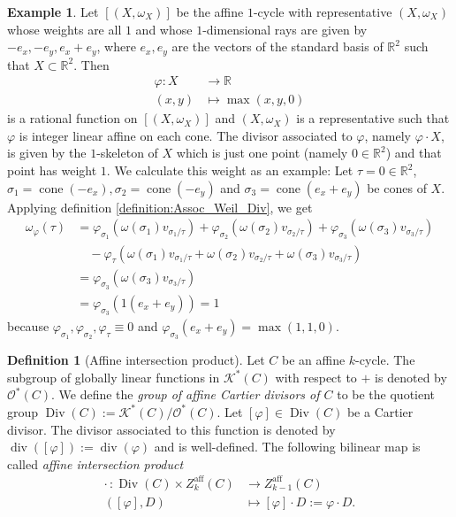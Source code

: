 \documentclass[11pt,reqno,a4]{amsart}
\theoremstyle{dotless}
\theoremstyle{definition}
\newtheorem{definition}[corollary]{Definition}
\newtheorem{example}[corollary]{Example}
\begin{document}
\begin{example}\label{example:pull_back_0_M_0,4}
Let $[(X,\omega_X)]$ be the affine $1$-cycle with representative $(X,\omega_X)$ whose weights are all $1$ and whose $1$-dimensional rays are given by $-e_x,-e_y,e_x+e_y$, where $e_x,e_y$ are the vectors of the standard basis of $\mathbb{R}^2$ such that $X\subset\mathbb{R}^2$. Then
\begin{align*}
\varphi: X &\to \mathbb{R}\\
(x,y)&\mapsto \max(x,y,0)
\end{align*}
is a rational function on $[(X,\omega_X)]$ and $(X,\omega_X)$ is a representative such that $\varphi$ is integer linear affine on each cone. The divisor associated to $\varphi$, namely $\varphi\cdot X$, is given by the $1$-skeleton of $X$ which is just one point (namely $0\in\mathbb{R}^2$) and that point has weight $1$. We calculate this weight as an example: Let $\tau=0\in\mathbb{R}^2$, $\sigma_1=\operatorname{cone}\left( -e_x  \right),\sigma_2=\operatorname{cone}\left(-e_y\right)$ and $\sigma_3=\operatorname{cone}\left(e_x+e_y\right)$ be cones of $X$. Applying definition \ref{definition:Assoc_Weil_Div}, we get
\begin{align*}
\omega_\varphi(\tau)&=\varphi_{\sigma_1}\left(\omega(\sigma_1)v_{\sigma_1/\tau}\right)
+\varphi_{\sigma_2}\left(\omega(\sigma_2)v_{\sigma_2/\tau}\right)
+\varphi_{\sigma_3}\left(\omega(\sigma_3)v_{\sigma_3/\tau}\right)\\
&\quad -\varphi_\tau\left( \omega(\sigma_1)v_{\sigma_1/\tau} + \omega(\sigma_2)v_{\sigma_2/\tau} + \omega(\sigma_3)v_{\sigma_3/\tau} \right)\\
&=\varphi_{\sigma_3}\left(\omega(\sigma_3)v_{\sigma_3/\tau}\right)\\
&=\varphi_{\sigma_3}\left( 1 (e_x+e_y) \right) = 1
\end{align*}
because $\varphi_{\sigma_1},\varphi_{\sigma_2},\varphi_{\tau}\equiv 0$ and $\varphi_{\sigma_3}\left(e_x+e_y \right)=\max(1,1,0)$.
\end{example}


\begin{definition}[Affine intersection product]
Let $C$ be an affine $k$-cycle. The subgroup of globally linear functions in $\mathcal{K}^*(C)$ with respect to $+$ is denoted by $\mathcal{O}^*(C)$. We define the \textit{group of affine Cartier divisors of $C$} to be the quotient group $\operatorname{Div}(C):=\mathcal{K}^*(C)/\mathcal{O}^*(C)$. Let $[\varphi]\in\operatorname{Div}(C)$ be a Cartier divisor. The divisor associated to this function is denoted by $\operatorname{div}([\varphi]):=\operatorname{div}(\varphi)$ and is well-defined. The following bilinear map is called \textit{affine intersection product}
\begin{align*}
\cdot\, : \operatorname{Div}(C)\times Z^{\textrm{aff}}_k(C) &\to Z^{\textrm{aff}}_{k-1}(C)\\
([\varphi],D) &\mapsto [\varphi]\cdot D := \varphi\cdot D.
\end{align*}
\end{definition}
\end{document}
